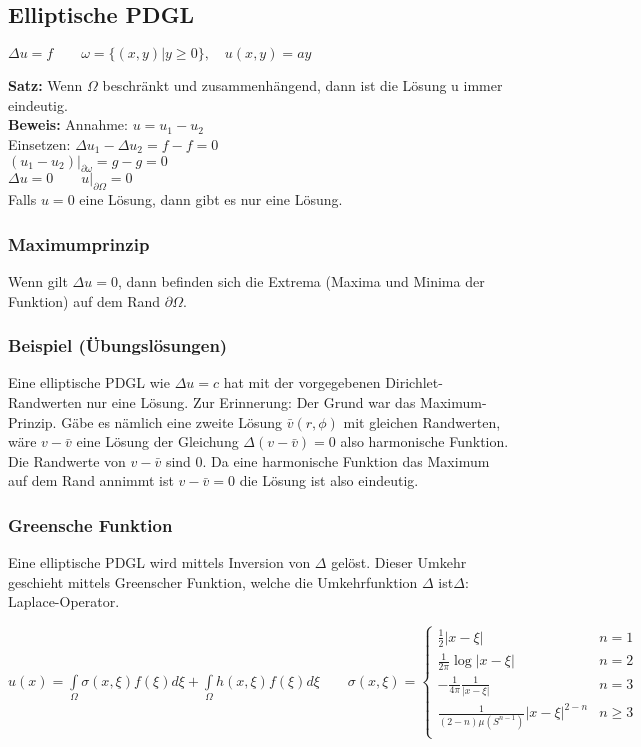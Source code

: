 \subsection{Elliptische PDGL}
$\Delta u=f\qquad \omega=\{(x,y)|y\geq 0\},\quad u(x,y)=ay$

\textbf{Satz:} Wenn $\Omega$ beschränkt und zusammenhängend, dann ist die Lösung u immer eindeutig.\\

\textbf{Beweis:} Annahme: $u=u_1-u_2$\\
Einsetzen: $\Delta u_1 - \Delta u_2=f-f=0$\\
$\left.(u_1-u_2)\right|_{\partial \omega}=g-g=0$\\
$\Delta u=0 \qquad \left.u\right|_{\partial\Omega}=0$\\
Falls $u=0$ eine Lösung, dann gibt es nur eine Lösung.

\subsubsection{Maximumprinzip} 

Wenn gilt $\Delta u=0$, dann befinden sich die Extrema (Maxima und Minima der Funktion) auf dem Rand $\partial\Omega$.

\subsubsection{Beispiel (Übungslösungen)}
Eine elliptische PDGL wie $\Delta u = c$ hat mit der vorgegebenen
Dirichlet-Randwerten nur eine Lösung. Zur Erinnerung: Der Grund war das
Maximum-Prinzip. Gäbe es nämlich eine zweite Lösung $\bar v(r,\phi)$ mit
gleichen Randwerten, wäre $v - \bar v$ eine Lösung der Gleichung $\Delta (v -
\bar v) = 0$ also harmonische Funktion. Die Randwerte von $v - \bar v$ sind 0. Da eine
harmonische Funktion das Maximum auf dem Rand annimmt ist $v - \bar v = 0$ die
Lösung ist also eindeutig.

\subsubsection{Greensche Funktion} 

Eine elliptische PDGL wird mittels Inversion von $\Delta$ gelöst. Dieser Umkehr geschieht mittels Greenscher Funktion, welche die Umkehrfunktion $\Delta$ ist\qquad $\Delta$: Laplace-Operator.

$u(x)=\int\limits_\Omega{\sigma(x,\xi)f(\xi)d\xi}+\int\limits_\Omega{h(x,\xi)f(\xi)d\xi}\qquad \sigma(x,\xi)=
\begin{cases}
	\frac 12|x-\xi| & n=1\\ 
	\frac 1{2\pi}\log|x-\xi| & n=2\\
	-\frac 1{4\pi}\frac{1}{|x-\xi|} & n=3\\
	\frac {1}{(2-n)\mu(S^{n-1})}|x-\xi|^{2-n} & n\geq 3\\
\end{cases}$\\


